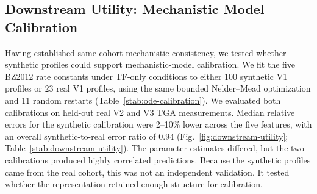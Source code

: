 \subsection{Downstream Utility: Mechanistic Model Calibration}
\label{sec:results-utility}

Having established same-cohort mechanistic consistency, we tested whether synthetic profiles
could support mechanistic-model calibration. We fit the
five BZ2012 rate constants under TF-only conditions to either $100$ synthetic V1 profiles or
$23$ real V1 profiles, using the same bounded Nelder--Mead optimization and 11 random restarts
(Table~\ref{stab:ode-calibration}). We evaluated both calibrations on held-out real V2 and V3
TGA measurements. Median relative errors for the synthetic calibration were 2--10\% lower
across the five features, with an overall synthetic-to-real error ratio of $0.94$
(Fig.~\ref{fig:downstream-utility}; Table~\ref{stab:downstream-utility}). The parameter
estimates differed, but the two calibrations produced highly correlated predictions. Because
the synthetic profiles came from the real cohort, this was not an independent validation. It
tested whether the representation retained enough structure for calibration.
 
